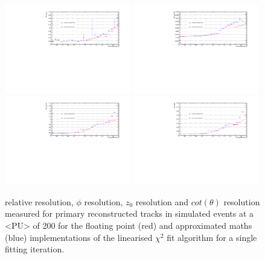 \begin{figure}[htb]
\centering
\includegraphics[width=0.49\textwidth]{figs/tk-upgrade/results-chi2fitter/ptRelResVsEta_It_1_ApproxVsExact.pdf}
\includegraphics[width=0.49\textwidth]{figs/tk-upgrade/results-chi2fitter/phi0ResVsEta_It_1_ApproxVsExact.pdf}
\\
\includegraphics[width=0.49\textwidth]{figs/tk-upgrade/results-chi2fitter/z0ResVsEta_It_1_ApproxVsExact.pdf}
\includegraphics[width=0.49\textwidth]{figs/tk-upgrade/results-chi2fitter/cotThetaResVsEta_It_1_ApproxVsExact.pdf}
\caption{
\pt relative resolution, $\phi$ resolution, $z_{0}$ resolution and $cot(\theta)$ resolution measured for primary reconstructed tracks in simulated \ttbar events at a <PU> of 200 for the floating point (red) and approximated maths (blue) implementations of the linearised $\chi^{2}$ fit algorithm for a single fitting iteration.
}
\label{fig:chi2HelixParametersResVsEtaApproxVsExact}
\end{figure}

